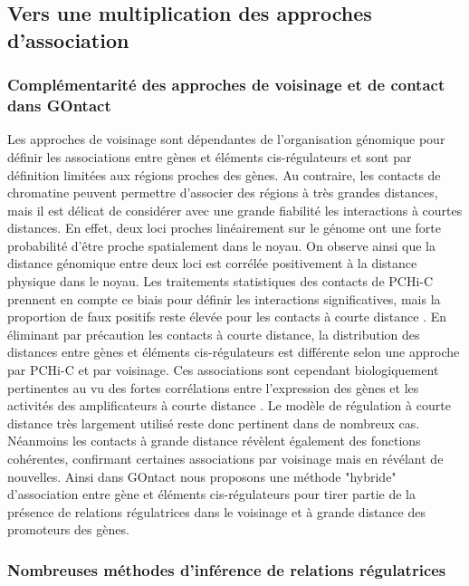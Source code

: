 \subsection{Vers une multiplication des approches d’association}
\subsubsection*{Complémentarité des approches de voisinage et de contact dans GOntact}

Les approches de voisinage sont dépendantes de l’organisation génomique pour définir les associations entre gènes et éléments \gls{cis}-régulateurs et sont par définition limitées aux régions proches des gènes. Au contraire, les contacts de chromatine peuvent permettre d’associer des régions à très grandes distances, mais il est délicat de considérer avec une grande fiabilité les interactions à courtes distances. En effet, deux loci proches linéairement sur le génome ont une forte probabilité d’être proche spatialement dans le noyau. On observe ainsi que la distance génomique entre deux loci est corrélée positivement à la distance physique dans le noyau. Les traitements statistiques des contacts de \acrshort{PCHi-C} prennent en compte ce biais pour définir les interactions significatives, mais la proportion de faux positifs reste élevée pour les contacts à courte distance \citep{cairns_chicago_2016}. En éliminant par précaution les contacts à courte distance, la distribution des distances entre gènes et éléments \gls{cis}-régulateurs est différente selon une approche par \acrshort{PCHi-C} et par voisinage. Ces associations sont cependant biologiquement pertinentes au vu des fortes corrélations entre l’expression des gènes et les activités des \glspl{amplificateur} à courte distance \citep{laverre_long-range_2022}. Le modèle de régulation à courte distance très largement utilisé reste donc pertinent dans de nombreux cas. Néanmoins les contacts à grande distance révèlent également des fonctions cohérentes, confirmant certaines associations par voisinage mais en révélant de nouvelles. Ainsi dans GOntact nous proposons une méthode "hybride" d'association entre gène et éléments \gls{cis}-régulateurs pour tirer partie de la présence de relations régulatrices dans le voisinage et à grande distance des promoteurs des gènes. \\

\subsubsection*{Nombreuses méthodes d'inférence de relations régulatrices}

